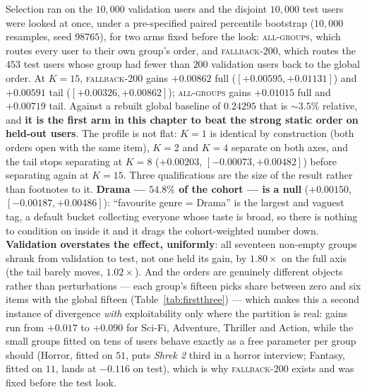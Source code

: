 \documentclass[11pt]{article}
\begin{document}
Selection ran on the $10{,}000$ validation users and the disjoint $10{,}000$ test users were looked at
once, under a pre-specified paired percentile bootstrap ($10{,}000$ resamples, seed $98765$), for two
arms fixed before the look: \textsc{all-groups}, which routes every user to their own group's order,
and \textsc{fallback-200}, which routes the $453$ test users whose group had fewer than $200$
validation users back to the global order. At $K{=}15$, \textsc{fallback-200} gains $+0.00862$ full
($[+0.00595,+0.01131]$) and $+0.00591$ tail ($[+0.00326,+0.00862]$); \textsc{all-groups} gains
$+0.01015$ full and $+0.00719$ tail. Against a rebuilt global baseline of $0.24295$ that is
$\sim\!3.5\%$ relative, and \textbf{it is the first arm in this chapter to beat the strong static
order on held-out users}. The profile is not flat: $K{=}1$ is identical by construction (both orders
open with the same item), $K{=}2$ and $K{=}4$ separate on both axes, and the tail stops separating at
$K{=}8$ ($+0.00203$, $[-0.00073,+0.00482]$) before separating again at $K{=}15$. Three qualifications
are the size of the result rather than footnotes to it. \textbf{Drama --- $54.8\%$ of the cohort ---
is a null} ($+0.00150$, $[-0.00187,+0.00486]$): ``favourite genre = Drama'' is the largest and vaguest
tag, a default bucket collecting everyone whose taste is broad, so there is nothing to condition on
inside it and it drags the cohort-weighted number down. \textbf{Validation overstates the effect,
uniformly}: all seventeen non-empty groups shrank from validation to test, not one held its gain, by
$1.80\times$ on the full axis (the tail barely moves, $1.02\times$). And the orders are genuinely
different objects rather than perturbations --- each group's fifteen picks share between zero and six
items with the global fifteen (Table~\ref{tab:firstthree}) --- which makes this a second instance of
divergence \emph{with} exploitability only where the partition is real: gains run from $+0.017$ to
$+0.090$ for Sci-Fi, Adventure, Thriller and Action, while the small groups fitted on tens of users
behave exactly as a free parameter per group should (Horror, fitted on $51$, puts \emph{Shrek 2}
third in a horror interview; Fantasy, fitted on $11$, lands at $-0.116$ on test), which is why
\textsc{fallback-200} exists and was fixed before the test look.
\end{document}
